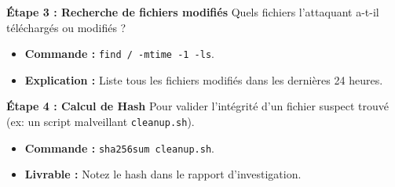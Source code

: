 \textbf{Étape 3 : Recherche de fichiers modifiés}
Quels fichiers l'attaquant a-t-il téléchargés ou modifiés ?
\begin{itemize}
    \item \textbf{Commande :} \texttt{find / -mtime -1 -ls}.
    \item \textbf{Explication :} Liste tous les fichiers modifiés dans les dernières 24 heures.
\end{itemize}

\textbf{Étape 4 : Calcul de Hash}
Pour valider l'intégrité d'un fichier suspect trouvé (ex: un script malveillant \texttt{cleanup.sh}).
\begin{itemize}
    \item \textbf{Commande :} \texttt{sha256sum cleanup.sh}.
    \item \textbf{Livrable :} Notez le hash dans le rapport d'investigation.
\end{itemize}


